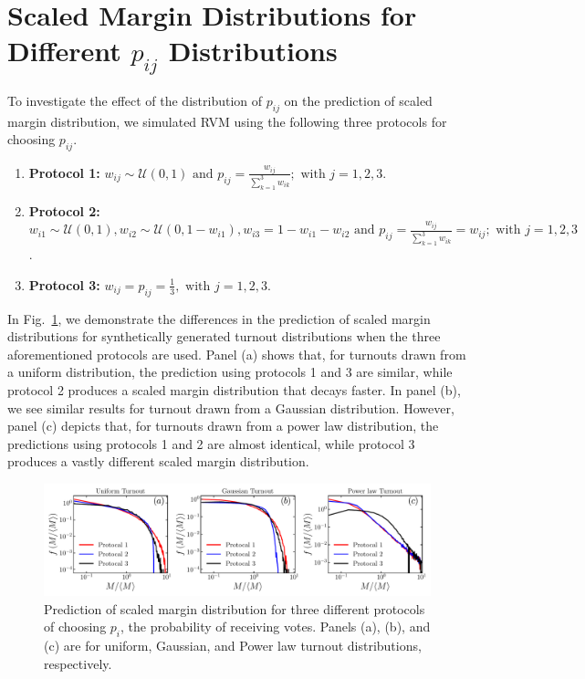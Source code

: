 \documentclass[reprint,aps,prl,showpacs,twocolumn, superscriptaddress]{revtex4-2}
\begin{document}
\section{Scaled Margin Distributions for Different $p_{ij}$ Distributions} 
To investigate the effect of the distribution of $p_{ij}$ on the prediction of scaled margin distribution, we simulated RVM using the following three protocols for choosing $p_{ij}$.
\begin{enumerate}
    \item \textbf{Protocol 1:} $w_{ij} \sim \mathcal{U}(0, 1) \text{ and } p_{ij} = \frac{w_{ij}}{\sum_{k=1}^3 w_{ik}}; \text{ with } j = 1, 2, 3$.
    \item \textbf{Protocol 2:} $w_{i1} \sim \mathcal{U}(0, 1), w_{i2} \sim \mathcal{U}(0, 1 - w_{i1}), w_{i3} = 1 - w_{i1} - w_{i2} \text{ and } p_{ij} = \frac{w_{ij}}{\sum_{k=1}^3 w_{ik}} = w_{ij}; \text{ with } j = 1, 2, 3$.
    \item \textbf{Protocol 3:} $w_{ij} = p_{ij} = \frac{1}{3}, \text{ with } j = 1, 2, 3$.
\end{enumerate}
In Fig.~\ref{fig_supp_3}, we demonstrate the differences in the prediction of scaled margin distributions for synthetically generated turnout distributions when the three aforementioned protocols are used. Panel (a) shows that, for turnouts drawn from a uniform distribution, the prediction using protocols 1 and 3 are similar, while protocol 2 produces a scaled margin distribution that decays faster. In panel (b), we see similar results for turnout drawn from a Gaussian distribution. However, panel (c) depicts that, for turnouts drawn from a power law distribution, the predictions using protocols 1 and 2 are almost identical, while protocol 3 produces a vastly different scaled margin distribution.

\begin{figure}[h!]
    \centering
    \includegraphics[width=1\textwidth]{fig_3_supp_rev_2.pdf}
    \caption{Prediction of scaled margin distribution for three different protocols of choosing $p_i$, the probability of receiving votes. Panels (a), (b), and (c) are for uniform, Gaussian, and Power law turnout distributions, respectively.}
    \label{fig_supp_3}
\end{figure}
\newpage
\end{document}
